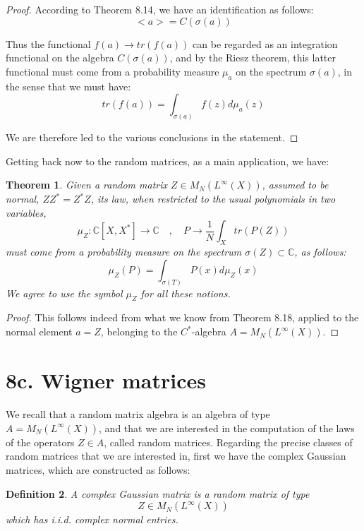 \documentclass[12pt]{amsbook}
\newtheorem{theorem}{Theorem}[chapter]
\newtheorem{definition}[theorem]{Definition}
\begin{document}
\begin{proof}
According to Theorem 8.14, we have an identification as follows: 
$$<a>=C(\sigma(a))$$

Thus the functional $f(a)\to tr(f(a))$ can be regarded as an integration functional on the algebra $C(\sigma(a))$, and by the Riesz theorem, this latter functional must come from a probability measure $\mu_a$ on the spectrum $\sigma(a)$, in the sense that we must have:
$$tr(f(a))=\int_{\sigma(a)}f(z)d\mu_a(z)$$

We are therefore led to the various conclusions in the statement.
\end{proof}

Getting back now to the random matrices, as a main application, we have:

\begin{theorem}
Given a random matrix $Z\in M_N(L^\infty(X))$, assumed to be normal, $ZZ^*=Z^*Z$, its law, when restricted to the usual polynomials in two variables,
$$\mu_Z:\mathbb C[X,X^*]\to\mathbb C\quad,\quad 
P\to\frac{1}{N}\int_Xtr(P(Z))$$
must come from a probability measure on the spectrum $\sigma(Z)\subset\mathbb C$, as follows:
$$\mu_Z(P)=\int_{\sigma(T)}P(x)d\mu_Z(x)$$
We agree to use the symbol $\mu_Z$ for all these notions.
\end{theorem}

\begin{proof}
This follows indeed from what we know from Theorem 8.18, applied to the normal element $a=Z$, belonging to the $C^*$-algebra $A=M_N(L^\infty(X))$. 
\end{proof}

\section*{8c. Wigner matrices}

We recall that a random matrix algebra is an algebra of type $A=M_N(L^\infty(X))$, and that we are interested in the computation of the laws of the operators $Z\in A$, called random matrices. Regarding the precise classes of random matrices that we are interested in, first we have the complex Gaussian matrices, which are constructed as follows:


\begin{definition}
A complex Gaussian matrix is a random matrix of type
$$Z\in M_N(L^\infty(X))$$
which has i.i.d. complex normal entries.
\end{definition}
\end{document}
